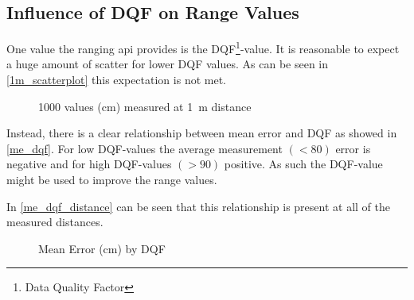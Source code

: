 \subsection{Influence of DQF on Range Values}
One value the ranging api provides is the DQF\footnote{Data Quality Factor}-value.
It is reasonable to expect a huge amount of scatter for lower DQF values.
As can be seen in \autoref{1m_scatterplot} this expectation is not met.

\begin{figure}[h]
	\centering
	
	\caption{1000 values (cm) measured at \SI{1}{\metre} distance}
	\label{1m_scatterplot}
\end{figure}

Instead, there is a clear relationship between mean error and DQF as showed in \autoref{me_dqf}.
For low DQF-values the average measurement $(< 80)$ error is negative and for high DQF-values $(> 90)$ positive.
As such the DQF-value might be used to improve the range values. 

In \autoref{me_dqf_distance} can be seen that this relationship is present at all of the measured distances.

%	
%
%	
\begin{figure}[h]
	\centering
	
	\caption[Mean Error by DQF]{Mean Error (cm) by DQF}
	\label{me_dqf}
\end{figure}

